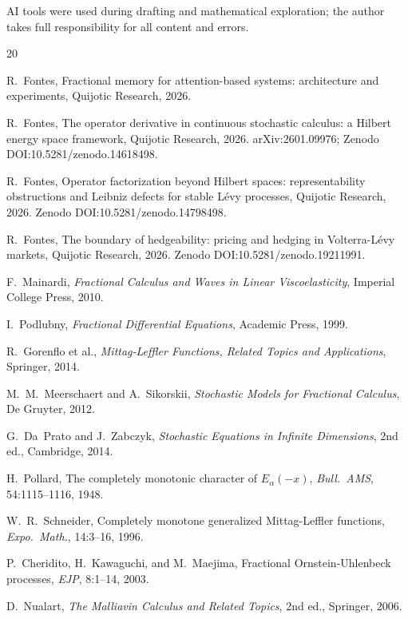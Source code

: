\documentclass[11pt]{article}
\theoremstyle{definition}
\theoremstyle{remark}
\begin{document}
AI tools were used during drafting and mathematical
exploration; the author takes full responsibility for
all content and errors.
\begin{thebibliography}{20}

R.~Fontes, Fractional memory for attention-based
systems: architecture and experiments,
Quijotic Research, 2026.

R.~Fontes, The operator derivative in continuous
stochastic calculus: a Hilbert energy space framework,
Quijotic Research, 2026.
arXiv:2601.09976; Zenodo DOI:10.5281/zenodo.14618498.

R.~Fontes, Operator factorization beyond Hilbert spaces:
representability obstructions and Leibniz defects for
stable L\'evy processes, Quijotic Research, 2026.
Zenodo DOI:10.5281/zenodo.14798498.

R.~Fontes, The boundary of hedgeability: pricing and
hedging in Volterra-L\'evy markets, Quijotic Research,
2026.
Zenodo DOI:10.5281/zenodo.19211991.

F.~Mainardi, \emph{Fractional Calculus and Waves in
Linear Viscoelasticity}, Imperial College Press, 2010.

I.~Podlubny, \emph{Fractional Differential Equations},
Academic Press, 1999.

R.~Gorenflo et al., \emph{Mittag-Leffler Functions,
Related Topics and Applications}, Springer, 2014.

M.~M.~Meerschaert and A.~Sikorskii, \emph{Stochastic
Models for Fractional Calculus}, De Gruyter, 2012.

G.~Da~Prato and J.~Zabczyk, \emph{Stochastic Equations
in Infinite Dimensions}, 2nd ed., Cambridge, 2014.

H.~Pollard, The completely monotonic character of
$E_\alpha(-x)$, \emph{Bull.\ AMS}, 54:1115--1116, 1948.

W.~R.~Schneider, Completely monotone generalized
Mittag-Leffler functions,
\emph{Expo.\ Math.}, 14:3--16, 1996.

P.~Cheridito, H.~Kawaguchi, and M.~Maejima, Fractional
Ornstein-Uhlenbeck processes, \emph{EJP}, 8:1--14, 2003.

D.~Nualart, \emph{The Malliavin Calculus and Related
Topics}, 2nd ed., Springer, 2006.

\end{thebibliography}
\end{document}
